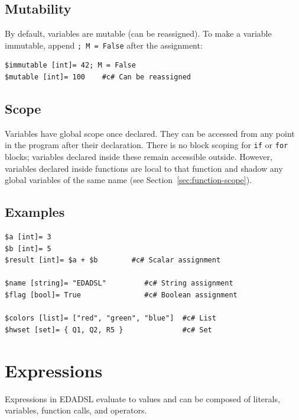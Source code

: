 \documentclass{report}
\begin{document}
\section{Mutability}
By default, variables are mutable (can be reassigned). To make a variable immutable, append \texttt{; M = False} after the assignment:
\begin{verbatim}
$immutable [int]= 42; M = False
$mutable [int]= 100    #c# Can be reassigned
\end{verbatim}

\section{Scope}
Variables have global scope once declared. They can be accessed from any point in the program after their declaration. There is no block scoping for \texttt{if} or \texttt{for} blocks; variables declared inside these remain accessible outside. However, variables declared inside functions are local to that function and shadow any global variables of the same name (see Section~\ref{sec:function-scope}).

\section{Examples}
\begin{verbatim}
$a [int]= 3
$b [int]= 5
$result [int]= $a + $b        #c# Scalar assignment

$name [string]= "EDADSL"         #c# String assignment
$flag [bool]= True               #c# Boolean assignment

$colors [list]= ["red", "green", "blue"]  #c# List
$hwset [set]= { Q1, Q2, R5 }              #c# Set
\end{verbatim}


\chapter{Expressions}
Expressions in EDADSL evaluate to values and can be composed of literals, variables, function calls, and operators.
\end{document}
